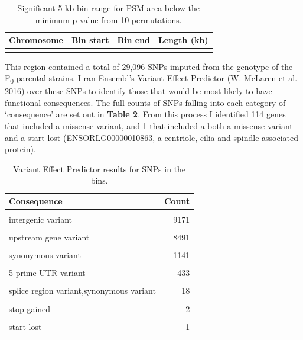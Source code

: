 \documentclass[
]{book}
\begin{document}
\begin{table}

\caption{\label{tab:somite-sig-psm-tbl}Significant 5-kb bin range for PSM area below the minimum p-value from 10 permutations.}
\centering
\begin{tabular}[t]{rrrr}
\toprule
Chromosome & Bin start & Bin end & Length (kb)\\
\midrule
\cellcolor{gray!6}{3} & \cellcolor{gray!6}{20375001} & \cellcolor{gray!6}{26285000} & \cellcolor{gray!6}{5910}\\
\bottomrule
\end{tabular}
\end{table}

This region contained a total of 29,096 SNPs imputed from the genotype of the F\textsubscript{0} parental strains.
I ran Ensembl's Variant Effect Predictor (W. McLaren et al. 2016) over these SNPs to identify those that would be most likely to have functional consequences. The full counts of SNPs falling into each category of `consequence' are set out in \textbf{Table \ref{tab:psm-consequence-tbl}}. From this process I identified 114 genes that included a missense variant, and 1 that included a both a missense variant and a start lost (ENSORLG00000010863, a centriole, cilia and spindle-associated protein).

\begin{table}

\caption{\label{tab:psm-consequence-tbl}Variant Effect Predictor results for SNPs in the bins.}
\centering
\begin{tabular}[t]{lr}
\toprule
Consequence & Count\\
\midrule
\cellcolor{gray!6}{intron variant} & \cellcolor{gray!6}{23189}\\
intergenic variant & 9171\\
\cellcolor{gray!6}{downstream gene variant} & \cellcolor{gray!6}{8894}\\
upstream gene variant & 8491\\
\cellcolor{gray!6}{3 prime UTR variant} & \cellcolor{gray!6}{2104}\\
\addlinespace
synonymous variant & 1141\\
\cellcolor{gray!6}{missense variant} & \cellcolor{gray!6}{716}\\
5 prime UTR variant & 433\\
\cellcolor{gray!6}{splice region variant,intron variant} & \cellcolor{gray!6}{184}\\
splice region variant,synonymous variant & 18\\
\addlinespace
\cellcolor{gray!6}{missense variant,splice region variant} & \cellcolor{gray!6}{7}\\
stop gained & 2\\
\cellcolor{gray!6}{splice donor variant} & \cellcolor{gray!6}{1}\\
start lost & 1\\
\bottomrule
\end{tabular}
\end{table}
\end{document}
